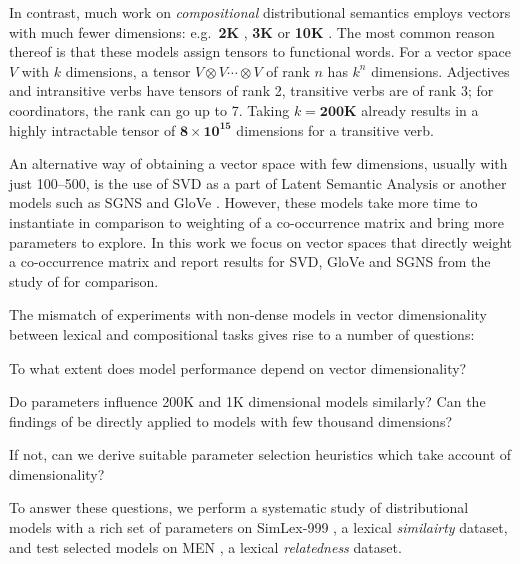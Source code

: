 \documentclass[11pt]{article}
\begin{document}
In contrast, much work on \emph{compositional} distributional semantics employs vectors with much fewer dimensions: e.g.~\textbf{2K} \cite{Grefenstette:2011:ESC:2145432.2145580,kartsadrqpl2014,milajevs-EtAl:2014:EMNLP2014}, \textbf{3K} \cite{Dinu:2010:MDS:1870658.1870771,milajevs-purver:2014:CVSC} or \textbf{10K} \cite{polajnar-clark:2014:EACL,Baroni2010nouns}. The most common reason thereof is that these models  assign tensors to functional words. For a vector space $V$ with $k$ dimensions,  a tensor $V \otimes V \cdots \otimes V$ of rank $n$ has $k^n$ dimensions. Adjectives and intransitive verbs have tensors of rank 2, transitive verbs are of rank 3; for coordinators, the rank can go up to 7. Taking $k = \textbf{200K}$ already results in a highly intractable tensor of $\textbf{8} \times \textbf{10}^{\textbf{15}}$ dimensions for a transitive verb. 

An alternative way of obtaining a vector space with few dimensions, usually with just 100--500, is the use of SVD as a part of Latent Semantic Analysis \cite{ARIS:ARIS1440380105} or another models such as SGNS \cite{mikolov2013efficient} and GloVe \cite{pennington2014glove}. However, these models take more time to instantiate in comparison to weighting of a co-occurrence matrix and bring more parameters to explore. In this work we focus on vector spaces that directly weight a co-occurrence matrix and report results for SVD, GloVe and SGNS from the study of  for comparison.



The mismatch of experiments with non-dense models in vector dimensionality between lexical and compositional tasks gives rise to a number of questions:
\begin{compactitem}
\item To what extent does model performance depend on vector dimensionality?
\item Do parameters influence 200K and 1K dimensional models similarly? Can the findings of  be directly applied to models with few thousand dimensions?
\item If not, can we derive suitable parameter selection heuristics which take account of dimensionality?
\end{compactitem}

To answer these questions, we perform a systematic study of distributional models with a rich set of parameters on SimLex-999  \cite{hill2014simlex}, a lexical \emph{similairty} dataset, and test selected models on MEN \cite{Bruni:2014:MDS:2655713.2655714}, a lexical \emph{relatedness} dataset.
\end{document}
